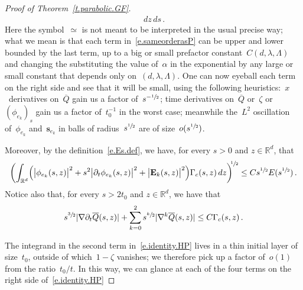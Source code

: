 \documentclass[11pt]{article} %
\numberwithin{equation}{section}
\theoremstyle{definition}
\newcommand*{\R}{\ensuremath{\mathbb{R}}}
\newcommand*{\Rd}{\ensuremath{\mathbb{R}^d}}
\newcommand{\s}{\mathbf{s}}
\begin{document}
\begin{proof}[{Proof of Theorem~\ref{t.parabolic.GF}}]
\begin{align}
\,dz\,ds
\,.
\end{align}
Here the symbol~$\simeq$ is not meant to be interpreted in the usual precise way; what we mean is that each term in~\eqref{e.sameorderasP} can be upper and lower bounded by the last term, up to a big or small prefactor constant~$C(d,\lambda,\Lambda)$ and changing the substituting the value of~$\alpha$ in the exponential by any large or small constant that depends only on~$(d,\lambda,\Lambda)$. 
One can now eyeball each term on the right side and see that it will be small, using the following heuristics:~$x$~derivatives on~$\overline{Q}$ gain us a factor of~$s^{-\sfrac12}$; time derivatives on~$\overline{Q}$ or~$\zeta$ or~$( \phi_{e_k})_s$ gain us a factor of~$t_0^{-1}$ in the worst case; meanwhile the~$L^2$ oscillation of~$\phi_{e_k}$ and~$\s_{e_k}$ in balls of radius~$s^{\sfrac12}$ are of size~$o(s^{\sfrac12})$. 

\smallskip

Moreover, by the definition~\eqref{e.Es.def}, we have, for every $s>0$ and $z \in \R^d$, that 
\begin{equation} \label{e.Green.E.est}
\biggl( 
\int_{\Rd} 
\Bigl( \bigl|\phi_{e_k}(s,z) \bigr|^2  + s^2 \bigl| \partial_t \phi_{e_k}(s,z) \bigr|^2 
+
\bigl|\mathbf{E}_k(s,z) \bigr|^2 \Bigr)
\Gamma_c(s,z)
\,dz
\biggr)^{\!\!\sfrac12 } 
\leq C s^{\sfrac12} E(s^{\sfrac12}) \,.
\end{equation}
Notice also that, for every $s>2t_0$ and $z \in \R^d$, we have that 
\begin{equation} \label{e.Qbar.bound}
s^{\sfrac 32} |\nabla \partial_t \overline{Q} (s,z)| + 
\sum_{k=0}^2 s^{\sfrac k2}|\nabla^k \overline{Q} (s,z)| \leq C \Gamma_c(s,z)\,.
\end{equation}

The integrand in the second term in~\eqref{e.identity.HP} lives in a thin initial layer of size~$t_0$, outside of which~$1-\zeta$ vanishes; we therefore pick up a factor of~$o(1)$ from the ratio~$t_0/t$. In this way, we can glance at each of the four terms on the right side of~\eqref{e.identity.HP} 

\smallskip


\end{proof}
\end{document}
